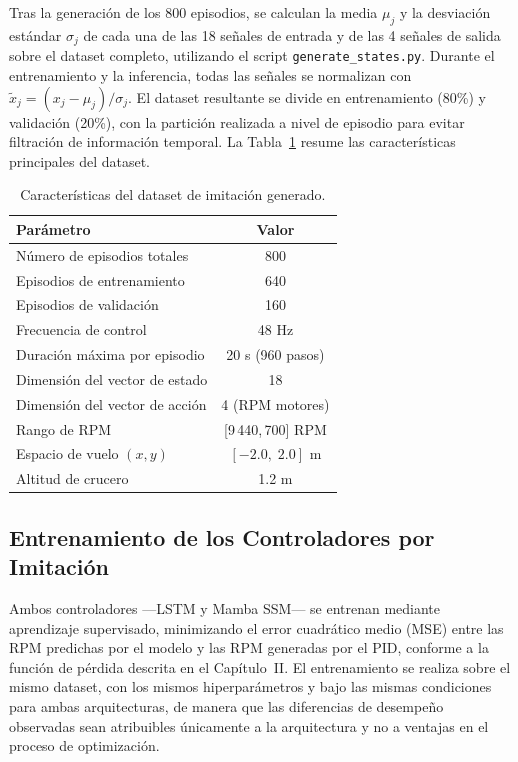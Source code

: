 Tras la generación de los 800 episodios, se calculan la media $\mu_j$ y la desviación estándar $\sigma_j$ de cada una de las 18 señales de entrada y de las 4 señales de salida sobre el dataset completo, utilizando el script \texttt{generate\_states.py}. Durante el entrenamiento y la inferencia, todas las señales se normalizan con $\tilde{x}_j = (x_j - \mu_j)/\sigma_j$. El dataset resultante se divide en entrenamiento (80\%) y validación (20\%), con la partición realizada a nivel de episodio para evitar filtración de información temporal. La Tabla~\ref{tab:dataset} resume las características principales del dataset.

\begin{table}[h]
\centering
\caption{Características del dataset de imitación generado.}
\label{tab:dataset}
\begin{tabular}{lc}
\hline
\textbf{Parámetro} & \textbf{Valor} \\
\hline
Número de episodios totales & 800 \\
Episodios de entrenamiento & 640 \\
Episodios de validación & 160 \\
Frecuencia de control & 48 Hz \\
Duración máxima por episodio & 20 s (960 pasos) \\
Dimensión del vector de estado & 18 \\
Dimensión del vector de acción & 4 (RPM motores) \\
Rango de RPM & [9\,440,\; 21\,700] RPM \\
Espacio de vuelo $(x, y)$ & $[-2.0,\; 2.0]$ m \\
Altitud de crucero & 1.2 m \\
\hline
\end{tabular}
\end{table}


\subsection{Entrenamiento de los Controladores por Imitación}
\label{sec:entrenamiento_imitacion}

Ambos controladores —LSTM y Mamba SSM— se entrenan mediante aprendizaje supervisado, minimizando el error cuadrático medio (MSE) entre las RPM predichas por el modelo y las RPM generadas por el PID, conforme a la función de pérdida descrita en el Capítulo~II. El entrenamiento se realiza sobre el mismo dataset, con los mismos hiperparámetros y bajo las mismas condiciones para ambas arquitecturas, de manera que las diferencias de desempeño observadas sean atribuibles únicamente a la arquitectura y no a ventajas en el proceso de optimización.

